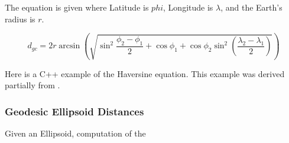 The equation is given where Latitude is $phi$, Longitude is $\lambda$, and the Earth's radius is $r$.

\begin{equation}
d_{gc} = 2r \arcsin \left( \sqrt{ \sin^2 \frac{\phi_2 - \phi_1}{2} + \cos{\phi_1} + \cos{\phi_2} \sin^2 \left( \frac{\lambda_2 - \lambda_1}{2} \right) }  \right)
\end{equation}

Here is a C++ example of the Haversine equation. This example was derived partially from \cite[p. 109]{Meyer_Book}.


\subsubsection*{Geodesic Ellipsoid Distances}

Given an Ellipsoid, computation of the 


